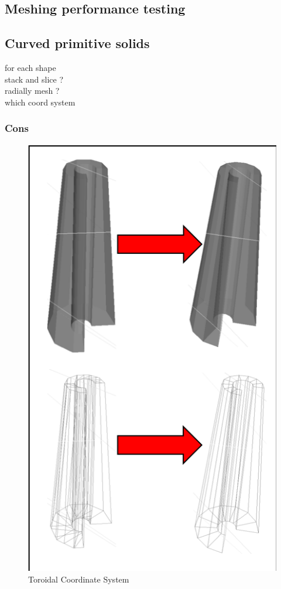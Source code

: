 \documentclass[12pt,a4paper]{article}
\begin{document}
\subsection{Meshing performance testing}

\subsection{Curved primitive solids}
for each shape\\
stack and slice ?\\
radially mesh ?\\
which coord system

\newpage
\subsubsection{Cons}

\begin{figure}[h!]
\centering
\includegraphics[scale=0.5]{Images//Meshes//cons.png}
\caption[width=\columnwidth]{Toroidal Coordinate System}
\label{conts}
\end{figure}
\end{document}
